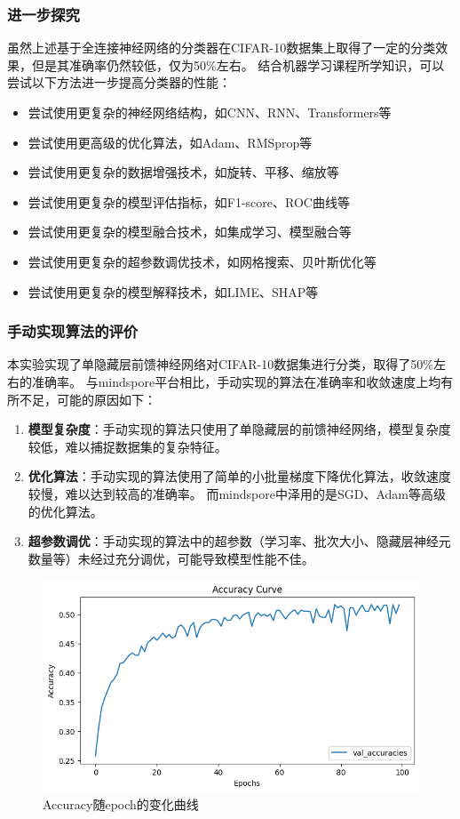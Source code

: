 \documentclass[12pt]{article}
\begin{document}
\subsubsection{进一步探究}
虽然上述基于全连接神经网络的分类器在CIFAR-10数据集上取得了一定的分类效果，但是其准确率仍然较低，仅为50\%左右。
结合机器学习课程所学知识，可以尝试以下方法进一步提高分类器的性能：

\begin{itemize}
  \item 尝试使用更复杂的神经网络结构，如CNN、RNN、Transformers等
  \item 尝试使用更高级的优化算法，如Adam、RMSprop等
  \item 尝试使用更复杂的数据增强技术，如旋转、平移、缩放等
  \item 尝试使用更复杂的模型评估指标，如F1-score、ROC曲线等
  \item 尝试使用更复杂的模型融合技术，如集成学习、模型融合等
  \item 尝试使用更复杂的超参数调优技术，如网格搜索、贝叶斯优化等
  \item 尝试使用更复杂的模型解释技术，如LIME、SHAP等
\end{itemize}

\subsubsection{手动实现算法的评价}
本实验实现了单隐藏层前馈神经网络对CIFAR-10数据集进行分类，取得了50\%左右的准确率。
与mindspore平台相比，手动实现的算法在准确率和收敛速度上均有所不足，可能的原因如下：
\begin{enumerate}
  \item \textbf{模型复杂度}：手动实现的算法只使用了单隐藏层的前馈神经网络，模型复杂度较低，难以捕捉数据集的复杂特征。
  \item \textbf{优化算法}：手动实现的算法使用了简单的小批量梯度下降优化算法，收敛速度较慢，难以达到较高的准确率。
        而mindspore中泽用的是SGD、Adam等高级的优化算法。
  \item \textbf{超参数调优}：手动实现的算法中的超参数（学习率、批次大小、隐藏层神经元数量等）未经过充分调优，可能导致模型性能不佳。
\end{enumerate}

\begin{figure}[htbp]
  \centering
  \includegraphics[scale=0.75]{figures/nn/accuracy_curve.png}
  \caption{Accuracy随epoch的变化曲线}
  \label{fig:accuracy_curve}
\end{figure}
\end{document}

